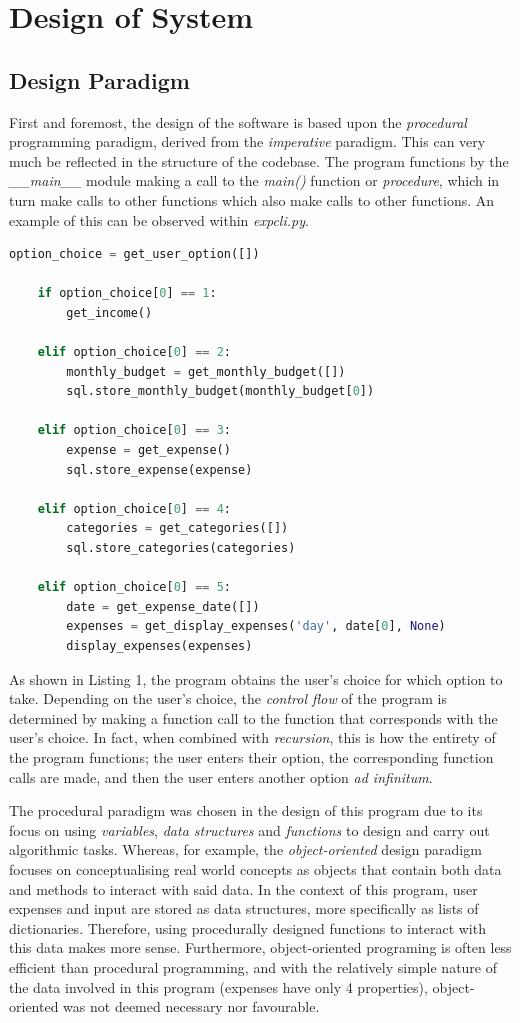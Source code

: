 \documentclass[12pt]{article}
\begin{document}
  \section{Design of System}
  \subsection{Design Paradigm}
  First and foremost, the design of the software is based upon the \textit{procedural} programming paradigm, derived from the \textit{imperative} paradigm.
  This can very much be reflected in the structure of the codebase. The program functions by the \textit{\_\_main\_\_} module making a call to the \textit{main()} function or \textit{procedure}, which in turn make calls to other functions which also make calls to other functions. An example of this can be observed within \textit{expcli.py}.
    \begin{lstlisting}[language=Python, caption=An example of procedural program design from \textit{expcli.py}, captionpos=b]
    option_choice = get_user_option([])

    if option_choice[0] == 1:
        get_income()

    elif option_choice[0] == 2:
        monthly_budget = get_monthly_budget([])
        sql.store_monthly_budget(monthly_budget[0])

    elif option_choice[0] == 3:
        expense = get_expense()
        sql.store_expense(expense)

    elif option_choice[0] == 4:
        categories = get_categories([])
        sql.store_categories(categories)

    elif option_choice[0] == 5:
        date = get_expense_date([])
        expenses = get_display_expenses('day', date[0], None)
        display_expenses(expenses)
    \end{lstlisting}
  As shown in Listing 1, the program obtains the user's choice for which option to take. Depending on the user's choice, the \textit{control flow} of the program is determined by making a function call to the function that corresponds with the user's choice. In fact, when combined with \textit{recursion}, this is how the entirety of the program functions; the user enters their option, the corresponding function calls are made, and then the user enters another option \textit{ad infinitum}.

  The procedural paradigm was chosen in the design of this program due to its focus on using \textit{variables}, \textit{data structures} and \textit{functions} to design and carry out algorithmic tasks. Whereas, for example, the \textit{object-oriented} design paradigm focuses on conceptualising real world concepts as objects that contain both data and methods to interact with said data. In the context of this program, user expenses and input are stored as data structures, more specifically as lists of dictionaries. Therefore, using procedurally designed functions to interact with this data makes more sense. Furthermore, object-oriented programing is often less efficient than procedural programming\cite{luca}, and with the relatively simple nature of the data involved in this program (expenses have only 4 properties), object-oriented was not deemed necessary nor favourable. 
\end{document}
